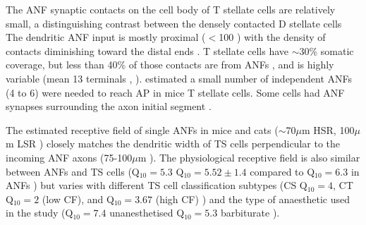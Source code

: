 The ANF synaptic contacts on the cell body of T stellate cells are relatively small,
 a distinguishing contrast between the densely contacted D stellate cells
 \citep{Cant:1981,Cant:1982,RyugoWrightEtAl:1993,TolbertMorest:1982a,FayPopper:1994,ReddCahillEtAl:2002,RyugoWrigthEtAl:1993,Ryugo:1992,RyugoParks:2003}
 The dendritic ANF input is mostly proximal ($<$100 \um) with the density of contacts
 diminishing toward the distal ends \citep{SmithRhode:1989}.  T stellate cells have
 $\sim$30\% somatic coverage, but less than 40\% of those contacts are from ANFs
 \citep{Cant:1981,Cant:1982,RyugoWrightEtAl:1993,TolbertMorest:1982a,SmithRhode:1989},
 and is highly variable (mean 13 terminals \citep*[36$\pm$10.5\% of somatic terminals in
 cat][]{SmithRhode:1989}, \citep*[0--6 terminals per soma in
 chinchilla][]{JosephsonMorest:1998}).  \citet{FerragamoGoldingEtAl:1998a} estimated
 a small number of independent ANFs (4 to 6) were needed to reach AP in mice T
 stellate cells.  Some cells had ANF synapses surrounding the axon initial segment
 \citep{JosephsonMorest:1998}.


  




 The estimated receptive field of single ANFs in mice and cats ($\sim$70$\mu$m HSR,
 100$\mu$m LSR
 \citep{OertelWuEtAl:1990,Ryugo:2008,MeltzerRyugo:2006,RyugoParks:2003,Ryugo:1992,BrownBerglundEtAl:1988,RoullierCronin-SchreiberEtAl:1986,FeketeRouillerEtAl:1984})
 closely matches the dendritic width of TS cells perpendicular to the incoming ANF
 axons (75-100$\mu$m \citep[Mouse]{OertelWuEtAl:1990}).
 The physiological receptive field is also similar between ANFs and TS cells
 (Q$_{10}=5.3$ \citep[cat][]{RhodeSmith:1986}Q$_{10}=5.52\pm1.4$ compared to
 Q$_{10}=6.3$ in ANFs \citep[guinea pig]{JiangPalmerEtAl:1996}) but varies with
 different TS cell classification subtypes (CS Q$_{10}=4$, CT Q$_{10}=2$ (low CF),
 and Q$_{10}=3.67$ (high CF) \citep[guinea pig]{PalmerWallaceEtAl:2003}) and the type
 of anaesthetic used in the study (Q$_{10}=7.4$ unanesthetised Q$_{10}=5.3$
 barbiturate \citep[cat][]{RhodeKettner:1987}).

